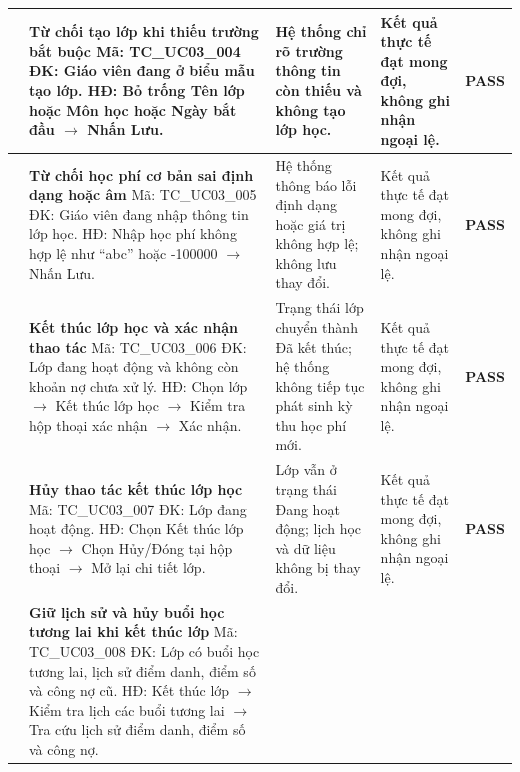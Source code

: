 \begin{longtable}{|>{\centering\arraybackslash}p{0.8cm}|>{\raggedright\arraybackslash}p{4.6cm}|>{\raggedright\arraybackslash}p{3.8cm}|>{\raggedright\arraybackslash}p{3.8cm}|>{\centering\arraybackslash}p{1.5cm}|}
\hline
4 & \textbf{Từ chối tạo lớp khi thiếu trường bắt buộc}\newline
Mã: TC\_UC03\_004\newline
ĐK: Giáo viên đang ở biểu mẫu tạo lớp.\newline
HĐ: Bỏ trống Tên lớp hoặc Môn học hoặc Ngày bắt đầu $\rightarrow$ Nhấn Lưu. &
Hệ thống chỉ rõ trường thông tin còn thiếu và không tạo lớp học. &
Kết quả thực tế đạt mong đợi, không ghi nhận ngoại lệ. & \textbf{PASS} \\
\hline
5 & \textbf{Từ chối học phí cơ bản sai định dạng hoặc âm}\newline
Mã: TC\_UC03\_005\newline
ĐK: Giáo viên đang nhập thông tin lớp học.\newline
HĐ: Nhập học phí không hợp lệ như ``abc'' hoặc -100000 $\rightarrow$ Nhấn Lưu. &
Hệ thống thông báo lỗi định dạng hoặc giá trị không hợp lệ; không lưu thay đổi. &
Kết quả thực tế đạt mong đợi, không ghi nhận ngoại lệ. & \textbf{PASS} \\
\hline
6 & \textbf{Kết thúc lớp học và xác nhận thao tác}\newline
Mã: TC\_UC03\_006\newline
ĐK: Lớp đang hoạt động và không còn khoản nợ chưa xử lý.\newline
HĐ: Chọn lớp $\rightarrow$ Kết thúc lớp học $\rightarrow$ Kiểm tra hộp thoại xác nhận $\rightarrow$ Xác nhận. &
Trạng thái lớp chuyển thành Đã kết thúc; hệ thống không tiếp tục phát sinh kỳ thu học phí mới. &
Kết quả thực tế đạt mong đợi, không ghi nhận ngoại lệ. & \textbf{PASS} \\
\hline
7 & \textbf{Hủy thao tác kết thúc lớp học}\newline
Mã: TC\_UC03\_007\newline
ĐK: Lớp đang hoạt động.\newline
HĐ: Chọn Kết thúc lớp học $\rightarrow$ Chọn Hủy/Đóng tại hộp thoại $\rightarrow$ Mở lại chi tiết lớp. &
Lớp vẫn ở trạng thái Đang hoạt động; lịch học và dữ liệu không bị thay đổi. &
Kết quả thực tế đạt mong đợi, không ghi nhận ngoại lệ. & \textbf{PASS} \\
\hline
8 & \textbf{Giữ lịch sử và hủy buổi học tương lai khi kết thúc lớp}\newline
Mã: TC\_UC03\_008\newline
ĐK: Lớp có buổi học tương lai, lịch sử điểm danh, điểm số và công nợ cũ.\newline
HĐ: Kết thúc lớp $\rightarrow$ Kiểm tra lịch các buổi tương lai $\rightarrow$ Tra cứu lịch sử điểm danh, điểm số và công nợ. &

\end{longtable}
